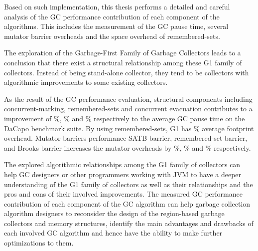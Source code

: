 Based on such implementation, this thesis performs a detailed
and careful analysis of the GC performance contribution of each component of the algorithms.
This includes the measurement of the GC pause time, several mutator barrier overheads
and the space overhead of remembered-sets.


The exploration of the Garbage-First Family of Garbage Collectors leads to a conclusion
that there exist a structural relationship among these G1 family of collectors.
Instead of being stand-alone collector, they tend to be collectors with
algorithmic improvements to some existing collectors.

As the result of the GC performance evaluation,
structural components including concurrent-marking, remembered-sets and concurrent
evacuation contributes to a improvement of \%, \% and \%
respectively to the average GC pause time on the DaCapo benchmark suite.
By using remembered-sets, G1 has \% average footprint overhead.
Mutator barriers performance SATB barrier, remembered-set barrier,
and Brooks barrier increases the mutator overheads by \%, \%
and  \%
respectively.


The explored algorithmic relationships among the G1 family of collectors can help
GC designers or other programmers working with JVM to have a deeper understanding of
the G1 family of collectors as well as their relationships and the pros and cons of their involved improvements.
The measured GC performance contribution of each component of the GC algorithm
can help garbage collection algorithm designers to reconsider the design of 
the region-based garbage collectors and memory structures, identify
the main advantages and drawbacks of each involved GC algorithm and
hence have the ability to make further optimizations to them.

